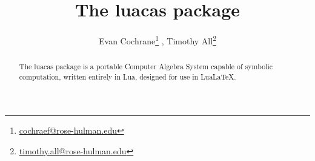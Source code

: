 \documentclass{article}
\begin{document}
\title{The {\ttfamily luacas} package}
\author{Evan Cochrane\thanks{\href{mailto:cochraef@rose-hulman.edu}{\ttfamily cochraef@rose-hulman.edu}} , Timothy All\thanks{\href{mailto:timothy.all@rose-hulman.edu}{\ttfamily timothy.all@rose-hulman.edu}}}
\date{} 

\maketitle 

\begin{abstract}
    The {\ttfamily luacas} package is a portable Computer Algebra System capable of symbolic computation, written entirely in Lua, designed for use in Lua\LaTeX{}.
\end{abstract}

\tableofcontents

















 

 













\appendix



\newpage

\printindex
\end{document}
